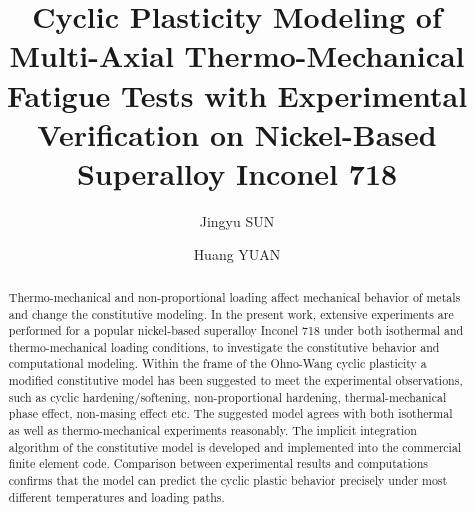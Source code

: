 \documentclass[preprint,5p,twocolumn,11pt,sort&compress]{elsarticle}
\begin{document}

\begin{frontmatter}



\title{Cyclic Plasticity Modeling of Multi-Axial Thermo-Mechanical Fatigue Tests with Experimental Verification on  Nickel-Based Superalloy Inconel 718}


\author{Jingyu SUN}
\author{Huang YUAN}

\address[label1]{School of Aerospace Engineering, Tsinghua University, Beijing, China}

\begin{abstract}
Thermo-mechanical  and non-proportional loading affect mechanical behavior of metals and change the constitutive modeling. In the present work, extensive experiments are performed for a popular nickel-based superalloy Inconel 718 under both isothermal and thermo-mechanical loading conditions, to investigate the constitutive behavior and computational modeling. Within the frame of the Ohno-Wang cyclic plasticity  a modified constitutive model has been suggested to meet the experimental observations, such as cyclic hardening/softening, non-proportional hardening, thermal-mechanical phase effect, non-masing effect etc. The suggested model agrees with both isothermal as well as thermo-mechanical experiments reasonably. The implicit integration algorithm of the constitutive model is developed and implemented into the commercial finite element code. Comparison between  experimental results and computations confirms that the model can predict the cyclic plastic behavior precisely under most different temperatures and loading paths.
\end{abstract}


\end{frontmatter}
\end{document}
